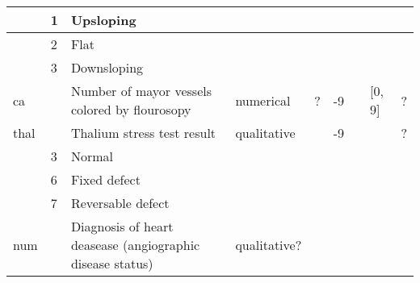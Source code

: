 \documentclass[a4paper,12pt]{article}
\begin{document}
\begin{adjustbox}{width=1\textwidth}
\begin{tabular}{|l|l|l|l|l|l|l|l|l|}
              & 1                  & Upsloping                                                  &              &                        &                      &                                       &               &              \\ \hline
              & 2                  & Flat                                                       &              &                        &                      &                                       &               &              \\ \hline
              & 3                  & Downsloping                                                &              &                        &                      &                                       &               &              \\ \hline
ca            &                    & Number of mayor vessels colored by flourosopy              & numerical    & ?                      & -9                   &                                       & [0, 9]        & ?            \\ \hline
thal          &                    & Thalium stress test result                                 & qualitative  &                        & -9                   &                                       &               & ?            \\ \hline
              & 3                  & Normal                                                     &              &                        &                      &                                       &               &              \\ \hline
              & 6                  & Fixed defect                                               &              &                        &                      &                                       &               &              \\ \hline
              & 7                  & Reversable defect                                          &              &                        &                      &                                       &               &              \\ \hline
num           &                    & Diagnosis of heart deasease (angiographic disease status)  & qualitative? &                        &                      &                                       &               &              \\ \hline

\end{tabular}
\end{adjustbox}
\end{document}

